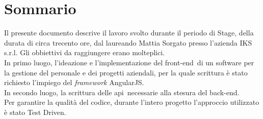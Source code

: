 
\cleardoublepage
{}
{}
\begingroup
\let\clearpage\relax
\let\cleardoublepage\relax
\let\cleardoublepage\relax

\chapter*{Sommario}

Il presente documento descrive il lavoro svolto durante il periodo di Stage, della durata di circa trecento ore, dal laureando Mattia Sorgato presso l'azienda IKS s.r.l. Gli obbiettivi da raggiungere erano molteplici.\\
In primo luogo, l'ideazione e l'implementazione del \gls{front-end}\glsfirstoccur\  di un software per la gestione del personale e dei progetti aziendali, per la quale scrittura è stato richiesto l'impiego del \emph{framework} AngularJS.\\
In secondo luogo, la scrittura delle \gls{api}\glsfirstoccur\  necessarie alla stesura del \gls{back-end}\glsfirstoccur.\\
Per garantire la qualità del codice, durante l'intero progetto l'approccio utilizzato è stato Test Driven.

%
%

\endgroup			

\vfill

